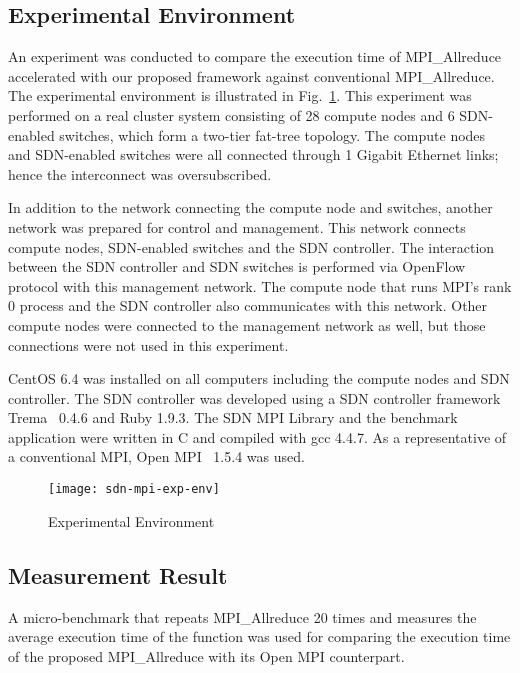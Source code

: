 \subsection{Experimental Environment}

An experiment was conducted to compare the execution time of MPI\_Allreduce
accelerated with our proposed framework against conventional
MPI\_Allreduce. The experimental environment is illustrated in
Fig.~\ref{fig:experiment-environment}. This experiment was performed on
a real cluster system consisting of 28 compute nodes and 6 SDN-enabled
switches, which form a two-tier fat-tree topology. The compute nodes and
SDN-enabled switches were all connected through 1 Gigabit Ethernet links;
hence the interconnect was oversubscribed.

In addition to the network connecting the compute node and switches,
another network was prepared for control and management. This network
connects compute nodes, SDN-enabled switches and the SDN controller.
The interaction between the SDN controller and SDN switches is performed
via OpenFlow protocol with this management network. The compute node
that runs MPI's rank 0 process and the SDN controller also communicates
with this network. Other compute nodes were connected to the
management network as well, but those connections were not used in this
experiment.

CentOS 6.4 was installed on all computers including the compute nodes and
SDN controller. The SDN controller was developed using a SDN controller
framework Trema~\autocite{trema} 0.4.6 and Ruby 1.9.3. The SDN
MPI Library and the benchmark application were written in C and
compiled with gcc 4.4.7. As a representative of a conventional MPI,
Open MPI~\autocite{Gabriel2004} 1.5.4 was used.

\begin{figure}
    \centering
    \texttt{[image: sdn-mpi-exp-env]}
    \caption{Experimental Environment}%
    \label{fig:experiment-environment}
\end{figure}

\subsection{Measurement Result}

A micro-benchmark that repeats MPI\_Allreduce 20
times and measures the average execution time of the function was used
for comparing the execution time of the proposed MPI\_Allreduce
with its Open MPI counterpart.

